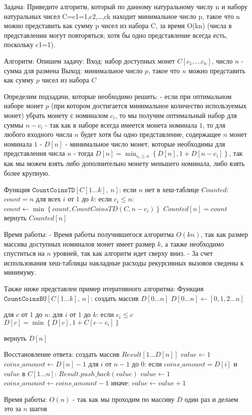 Задача:
Приведите алгоритм, который по данному натуральному числу n и набору натуральных чисел C={c1=1,c2,…,ck} находит
минимальное число p, такое что n можно представить как сумму p чисел из набора C, за время O(kn) (числа в представлении
могут повторяться; хотя бы одно представление всегда есть, поскольку c1=1).

Алгоритм:
Опишем задачу:
Вход: набор доступных монет $C[c_1, \ldots c_n]$, число $n$ - сумма для размена
Выход: минимальное число $p$, такое что $n$ можно представить как сумму $p$ чисел из набора $C$

Определим подзадачи, которые необходимо решить:
- если при оптимальном наборе монет $p$ (при котором достигается минимальное количество используемых монет) убрать монету
 с номиналом $c_i$, то мы получим оптимальный набор для суммы $n - c_i$
- так как в наборе всегда имеется монета номинала $1$, то для любого входного числа $n$ будет хотя бы одно представление,
содержащее $n$ монет номинала $1$
- $D[n]$ - минимальное число монет, которые необходимы для представления числа $n$
- тогда $\displaystyle{D[n] = \min_{c_i \leq n}\left\{D[n], 1 + D[n - c_i]\right\}}$, так как мы можем взять либо дополнительно монету
меньшего номинала, либо взять более крупную.

Функция $\texttt{CountCoinsTD}[C[1 \ldots k], \: n]$:
если $n$ нет в хеш-таблице $Counted$:
    $count = n$
    для всех $i$ от $1$ до $k$:
        если $c_i \leq n$:
            $count \leftarrow \min\left\{count, CountCoinsTD(C, n - c_i)\right\}$
    $Counted[n] = count$
вернуть $Counted[n]$

Время работы:
- Время работы получившегося алгоритма $O(kn)$, так как размер массива доступных номиналов монет имеет размер $k$, а также
необходимо спуститься на $n$ уровней, так как алгоритм идет сверху вниз.
- За счет использования хеш-таблицы накладные расходы рекурсивных вызовов сведены к минимуму.

Также ниже представлен пример итеративного алгоритма:
Функция $\texttt{CountCoinsBU}[C[1 \ldots k], \: n]$:
создать массив $D[0 \ldots n]$
$D[0 \ldots n] \leftarrow [0, 1, 2 \ldots n]$

для $c$ от $1$ до $n$:
    для $i$ от $1$ до $k$:
        если $c_i \leq c$
            $D[c] = \min\left\{D[c], 1 + C[c - c_i]\right\}$

вернуть $D[n]$

Восстановление ответа:
создать массив $Result[1 \ldots D[n]]$
$value \leftarrow 1$
$coins\_amount \leftarrow D[n] - 1$
для $i$ от $n - 1$ до $0$:
    если $coins\_amount = D[i]$ и $value$ в $C[1 \ldots n]$:
        $Result.push\_back(value)$
        $value \leftarrow 1$
        $coins\_amount \leftarrow coins\_amount - 1$
    иначе:
        $value \leftarrow value + 1$

Время работы: $O(n)$ - так как мы проходим по массиву $D$ один раз и делаем это за $n$ шагов